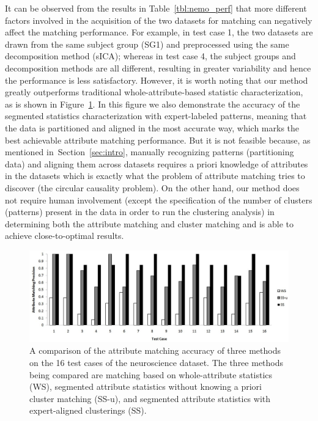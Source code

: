 It can be observed from the results in Table~\ref{tbl:nemo_perf} that more different factors involved in the acquisition of the two datasets for matching can negatively affect the matching performance. For example, in test case 1, the two datasets are drawn from the same subject group (SG1) and preprocessed using the same decomposition method (sICA); whereas in test case 4, the subject groups and decomposition methods are all different, resulting in greater variability and hence the performance is less satisfactory. However, it is worth noting that our method greatly outperforms traditional whole-attribute-based statistic characterization, as is shown in Figure~\ref{fig:perf_comp}. In this figure we also demonstrate the accuracy of the segmented statistics characterization with expert-labeled patterns, meaning that the data is partitioned and aligned in the most accurate way, which marks the best achievable attribute matching performance. But it is not feasible because, as mentioned in~Section~\ref{sec:intro}, manually recognizing patterns (partitioning data) and aligning them across datasets requires a priori knowledge of attributes in the datasets which is exactly what the problem of attribute matching tries to discover (the circular causality problem). On the other hand, our method does not require human involvement (except the specification of the number of clusters (patterns) present in the data in order to run the clustering analysis) in determining both the attribute matching and cluster matching and is able to achieve close-to-optimal results.

\begin{figure}[tb]
\begin{center}
\includegraphics[width=1.\textwidth]{fig/perf_comp.eps}
\end{center}
\caption{\label{fig:perf_comp} A comparison of the attribute matching accuracy of three methods on the 16 test cases of the neuroscience dataset. The three methods being compared are matching based on whole-attribute statistics (WS), segmented attribute statistics without knowing a priori cluster matching (SS-u), and segmented attribute statistics with expert-aligned clusterings (SS).}
\end{figure}



